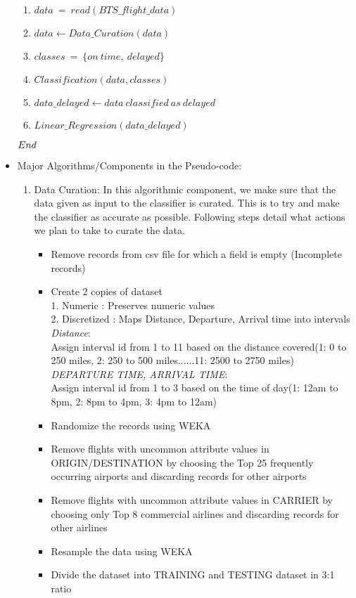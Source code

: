 \begin{itemize}
\begin{enumerate}
\item{$data\ =\ read(BTS\_flight\_data)$}
\item{$data \gets Data\_Curation(data)$}
\item{$classes\ =\ \{on\ time,\ delayed\}$}
\item{$Classification(data,classes)$}
\item{$data\_delayed \gets data\ classified\ as\ delayed$}
\item{$Linear\_Regression(data\_delayed)$}
\end{enumerate}
$End\\\\$
\item{Major Algorithms/Components in the Pseudo-code: }
\begin{enumerate}
\item{Data Curation: }
In this algorithmic component, we make sure that the data given as input to the classifier is curated. This is to try and make the classifier as accurate as possible. Following steps detail what actions we plan to take to curate the data.
\begin{itemize}
\item{ Remove records from csv file for which a field is empty (Incomplete records)}
\item{ Create 2 copies of dataset 
\\	1. Numeric : Preserves numeric values 
\\	2. Discretized : Maps Distance, Departure, Arrival time into intervals
\\\textit{Distance}: 
\\Assign interval id from 1 to 11 based on the distance covered(1: 0 to 250 miles, 2: 250 to 500 miles......11: 2500 to 2750 miles)
\\\textit{DEPARTURE TIME, ARRIVAL TIME}: 
\\Assign interval id from 1 to 3 based on the time of day(1: 12am to 8pm, 2: 8pm to 4pm, 3: 4pm to 12am)
}
\item{Randomize the records using WEKA}
\item{Remove flights with uncommon attribute values in ORIGIN/DESTINATION by choosing the Top 25 frequently occurring airports and discarding records for other airports}
\item{Remove flights with uncommon attribute values in CARRIER by choosing only Top 8 commercial airlines and discarding records for other airlines}
\item{Resample the data using WEKA}
\item{Divide the dataset into TRAINING and TESTING dataset in 3:1 ratio}
\end{itemize}


\end{enumerate}
\end{itemize}
